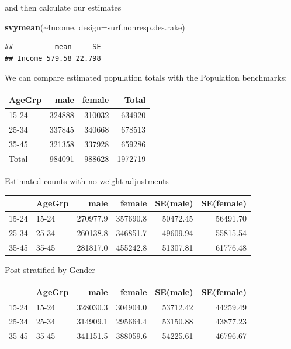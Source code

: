 \documentclass[
]{book}
\newenvironment{Shaded}{\begin{snugshade}}{\end{snugshade}}
\newcommand{\AttributeTok}[1]{\textcolor[rgb]{0.13,0.29,0.53}{#1}}
\newcommand{\FunctionTok}[1]{\textcolor[rgb]{0.13,0.29,0.53}{\textbf{#1}}}
\newcommand{\NormalTok}[1]{#1}
\newcommand{\SpecialCharTok}[1]{\textcolor[rgb]{0.81,0.36,0.00}{\textbf{#1}}}
\begin{document}
and then calculate our estimates

\begin{Shaded}
\begin{Highlighting}[]
\FunctionTok{svymean}\NormalTok{(}\SpecialCharTok{\textasciitilde{}}\NormalTok{Income, }\AttributeTok{design=}\NormalTok{surf.nonresp.des.rake)}
\end{Highlighting}
\end{Shaded}

\begin{verbatim}
##          mean     SE
## Income 579.58 22.798
\end{verbatim}

We can compare estimated population totals with the Population benchmarks:

\begin{table}
\centering
\begin{tabular}[t]{l|r|r|r}
\hline
AgeGrp & male & female & Total\\
\hline
15-24 & 324888 & 310032 & 634920\\
\hline
25-34 & 337845 & 340668 & 678513\\
\hline
35-45 & 321358 & 337928 & 659286\\
\hline
Total & 984091 & 988628 & 1972719\\
\hline
\end{tabular}
\end{table}

Estimated counts with no weight adjustments

\begin{table}
\centering
\begin{tabular}[t]{l|l|r|r|r|r}
\hline
  & AgeGrp & male & female & SE(male) & SE(female)\\
\hline
15-24 & 15-24 & 270977.9 & 357690.8 & 50472.45 & 56491.70\\
\hline
25-34 & 25-34 & 260138.8 & 346851.7 & 49609.94 & 55815.54\\
\hline
35-45 & 35-45 & 281817.0 & 455242.8 & 51307.81 & 61776.48\\
\hline
\end{tabular}
\end{table}

Post-stratified by Gender

\begin{table}
\centering
\begin{tabular}[t]{l|l|r|r|r|r}
\hline
  & AgeGrp & male & female & SE(male) & SE(female)\\
\hline
15-24 & 15-24 & 328030.3 & 304904.0 & 53712.42 & 44259.49\\
\hline
25-34 & 25-34 & 314909.1 & 295664.4 & 53150.88 & 43877.23\\
\hline
35-45 & 35-45 & 341151.5 & 388059.6 & 54225.61 & 46796.67\\
\hline
\end{tabular}
\end{table}
\end{document}
